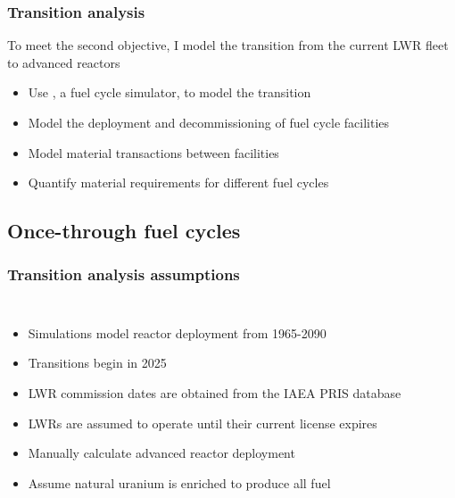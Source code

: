 \begin{frame}
    \frametitle{Transition analysis}
    To meet the second objective, I model the transition from the current 
    \gls{LWR} fleet to advanced reactors
    \begin{itemize}
        \item<2-> Use \Cyclus \cite{huff_fundamental_2016}, 
              a fuel cycle simulator, to model the transition
        \item<2-> Model the deployment and decommissioning of fuel cycle facilities 
        \item<2-> Model material transactions between facilities
        \item<3-> Quantify material requirements for different fuel cycles
    \end{itemize}

\end{frame}

\subsection{Once-through fuel cycles}
\begin{frame}
    \frametitle{Transition analysis assumptions}
    \begin{columns}
        
    \column[t]{6cm}
    \vspace{-0.9cm}
    

        \column[t]{4.5cm}
        \begin{itemize}
            \item Simulations model reactor deployment from 1965-2090
            \item Transitions begin in 2025
            \item<2-> \gls{LWR} commission dates are obtained from the IAEA PRIS
                database \cite{noauthor_power_1989}
            \item<2-> \glspl{LWR} are assumed to operate until their current license 
                expires
            \item<3-> Manually calculate advanced reactor deployment
            \item<3-> Assume natural uranium is enriched to produce all 
                  fuel
        \end{itemize}

\end{columns}
\end{frame}

